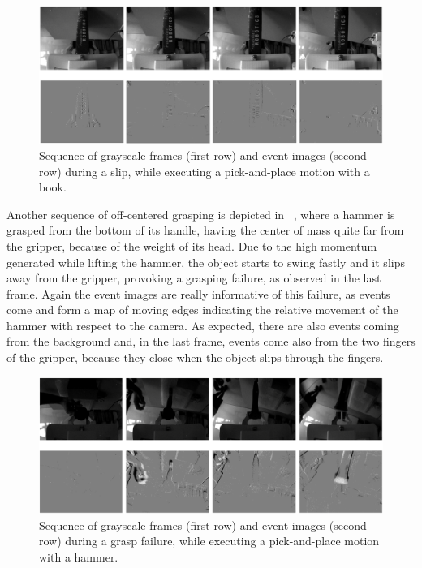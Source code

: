 \begin{figure}[h]
    \centering
    \includegraphics[width=\textwidth]{resources/images/init_exp1}
    \caption{Sequence of grayscale frames (first row) and event images (second row) during a slip, while executing a pick-and-place motion with a book.}\label{fig:init_exp1}
\end{figure}

Another sequence of off-centered grasping is depicted in ~, where a hammer is grasped from the bottom of its handle, having the center of mass quite far from the gripper, because of the weight of its head. Due to the high momentum generated while lifting the hammer, the object starts to swing fastly and it slips away from the gripper, provoking a grasping failure, as observed in the last frame. Again the event images are really informative of this failure, as events come and form a map of moving edges indicating the relative movement of the hammer with respect to the camera. As expected, there are also events coming from the background and, in the last frame, events come also from the two fingers of the gripper, because they close when the object slips through the fingers.

\begin{figure}[H]
    \centering
    \includegraphics[width=\textwidth]{resources/images/init_exp2}
    \caption{Sequence of grayscale frames (first row) and event images (second row) during a grasp failure, while executing a pick-and-place motion with a hammer.}\label{fig:init_exp2}
\end{figure}

